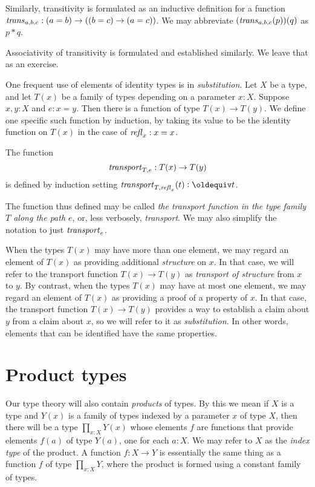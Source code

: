 Similarly, transitivity is formulated as an inductive definition for a function $\mathop{\mathit{trans}}_{a,b,c} : (a=b) \to ((b=c) \to (a=c))$.  We may
abbreviate $(\mathop{\mathit{trans}}_{a,b,c}(p))(q)$ as $p*q$.

Associativity of transitivity is formulated and established similarly.  We leave that as an exercise.

One frequent use of elements of identity types is in \emph{substitution}.  Let $X$ be a type, and let $T(x)$ be a family of types depending on a
parameter $x:X$.  Suppose $x,y:X$ and $e:x=y$.  Then there is a function of type $T(x) \to T(y)$. We define one specific such function by induction, by taking its value to be the identity function on $T(x)$ in the case of $\mathop{{\it refl}_{x}}:x=x$.
\begin{definition}\label{def:transport} The function
  \[ 
  \mathord{\mathit{transport}}_{T,e} : T(x) \to T(y)
  \]
  is defined by induction setting $\trp_{T,\refl{x}} (t) \defeq t$.
\end{definition} 
The function thus defined may be called 
\emph{the transport function in the type family $T$ along the path $e$}, 
 or, less verbosely, \emph{transport}.
 We may also simplify the notation to just $\mathord{\mathit{transport}}_e$.

When the types $T(x)$ may have more than one element, 
we may regard an element of $T(x)$ as providing additional {\em structure} on $x$. 
In that case, we will refer to the transport function $T(x) \to T(y)$ as 
\emph{transport of structure} from $x$ to $y$.  By contrast, when the types
$T(x)$ may have at most one element, we may regard an element of $T(x)$ 
as providing a proof of a property of $x$. In that case, the transport
function $T(x) \to T(y)$ provides a way to establish a claim about $y$ 
from a claim about $x$, so we will refer to it as \emph{substitution}.  In
other words, elements that can be identified have the same properties.

\section{Product types}
\label{sec:product-types}
Our type theory will also contain \emph{products} of types. 
By this we mean if $X$ is a type and $Y(x)$ is a family of types indexed by a
parameter $x$ of type $X$, then there will be a type $\prod_{x:X} Y(x)$ 
whose elements $f$ are functions that provide elements $f(a)$ of type
$Y(a)$, one for each $a:X$. We may refer to $X$ as the 
\emph{index type} of the product. 
A function $f : X \to Y$ is essentially the same thing as a function $f$ 
of type $\prod_{x:X} Y$, where the product is formed using a constant family of types.

